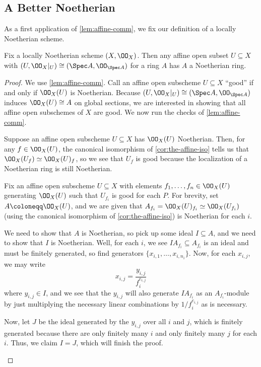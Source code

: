 \documentclass[../notes.tex]{subfiles}
\begin{document}
\subsection{A Better Noetherian}
As a first application of \autoref{lem:affine-comm}, we fix our definition of a locally Noetherian scheme.
\begin{proposition} \label{prop:better-local-noetherian}
	Fix a locally Noetherian scheme $(X,\OO_X)$. Then any affine open subset $U\subseteq X$ with $(U,\OO_X|_U)\cong(\Spec A,\OO_{\Spec A})$ for a ring $A$ has $A$ a Noetherian ring.
\end{proposition}
\begin{proof}
	We use \autoref{lem:affine-comm}. Call an affine open subscheme $U\subseteq X$ ``good'' if and only if $\OO_X(U)$ is Noetherian. Because $(U,\OO_X|_U)\cong(\Spec A,\OO_{\Spec A})$ induces $\OO_X(U)\cong A$ on global sections, we are interested in showing that all affine open subschemes of $X$ are good. We now run the checks of \autoref{lem:affine-comm}.
	\begin{listroman}
		\item Suppose an affine open subscheme $U\subseteq X$ has $\OO_X(U)$ Noetherian. Then, for any $f\in\OO_X(U)$, the canonical isomorphism of \autoref{cor:the-affine-iso} tells us that $\OO_X(U_f)\simeq\OO_X(U)_f$, so we see that $U_f$ is good because the localization of a Noetherian ring is still Noetherian.
		\item Fix an affine open subscheme $U\subseteq X$ with elements $f_1,\ldots,f_n\in\OO_X(U)$ generating $\OO_X(U)$ such that $U_{f_i}$ is good for each $P$. For brevity, set $A\coloneqq\OO_X(U)$, and we are given that $A_{f_i}=\OO_X(U)_{f_i}\simeq\OO_X(U_{f_i})$ (using the canonical isomorphism of \autoref{cor:the-affine-iso}) is Noetherian for each $i$.

		We need to show that $A$ is Noetherian, so pick up some ideal $I\subseteq A$, and we need to show that $I$ is Noetherian. Well, for each $i$, we see $IA_{f_i}\subseteq A_{f_i}$ is an ideal and must be finitely generated, so find generators $\{x_{i,1},\ldots,x_{i,n_i}\}$. Now, for each $x_{i,j}$, we may write
		\[x_{i,j}=\frac{y_{i,j}}{f_i^{e_{i,j}}}\]
		where $y_{i,j}\in I$, and we see that the $y_{i,j}$ will also generate $IA_{f_i}$ as an $A_{f_i}$-module by just multiplying the necessary linear combinations by $1/f_i^{e_{i,j}}$ as is necessary.

		Now, let $J$ be the ideal generated by the $y_{i,j}$ over all $i$ and $j$, which is finitely generated because there are only finitely many $i$ and only finitely many $j$ for each $i$. Thus, we claim $I=J$, which will finish the proof.


\end{listroman}
\end{proof}
\end{document}

